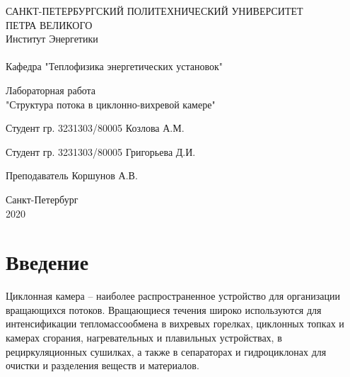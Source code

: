 \documentclass[12pt,a4paper]{article}
\begin{document}
\begin{titlepage}

\begin{center}
САНКТ-ПЕТЕРБУРГСКИЙ ПОЛИТЕХНИЧЕСКИЙ УНИВЕРСИТЕТ\\ ПЕТРА ВЕЛИКОГО\\
\vspace{0.1cm}
Институт Энергетики\\
\hrulefill \\
\vspace{0.5cm}
Кафедра "Теплофизика энергетических установок"\\

\end{center}

\vspace{5cm}
\begin{center}
\begin{large}
Лабораторная работа \\
"Структура потока в циклонно-вихревой камере"
\end{large}
\end{center}

\vspace{5cm}
\hspace{5cm} Студент гр. 3231303/80005 \hrulefill Козлова А.М.

\hspace{5cm} Студент гр. 3231303/80005 \hrulefill Григорьева Д.И.

\vspace{0.5cm}
\hspace{5cm} Преподаватель \hrulefill Коршунов А.В. \\


\vfill
\begin{center}
Санкт-Петербург\\
2020
\end{center}


\end{titlepage}



\tableofcontents
\newpage

\section{Введение}

Циклонная камера – наиболее распространенное устройство для
организации вращающихся потоков. Вращающиеся течения широко
используются для интенсификации тепломассообмена в вихревых горелках, циклонных топках и камерах сгорания, нагревательных и плавильных устройствах, в рециркуляционных сушилках, а также в сепараторах и гидроциклонах для очистки и разделения веществ и материалов.
\end{document}

